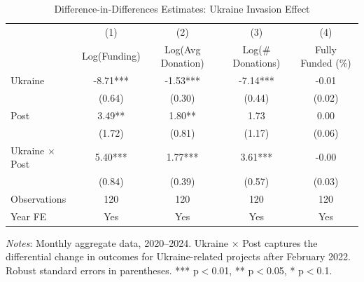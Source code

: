 \begin{table}[htbp]
\centering
\caption{Difference-in-Differences Estimates: Ukraine Invasion Effect}
\label{tab:did}
\begin{threeparttable}
\begin{tabular}{lcccc}
\toprule
& (1) & (2) & (3) & (4) \\
& Log(Funding) & Log(Avg Donation) & Log(\# Donations) & Fully Funded (\%) \\
\midrule
Ukraine & -8.71*** & -1.53*** & -7.14*** & -0.01 \\
& (0.64) & (0.30) & (0.44) & (0.02) \\
Post & 3.49** & 1.80** & 1.73 & 0.00 \\
& (1.72) & (0.81) & (1.17) & (0.06) \\
Ukraine $\times$ Post & 5.40*** & 1.77*** & 3.61*** & -0.00 \\
& (0.84) & (0.39) & (0.57) & (0.03) \\
\addlinespace
Observations & 120 & 120 & 120 & 120 \\
Year FE & Yes & Yes & Yes & Yes \\
\bottomrule
\end{tabular}
\begin{tablenotes}
\small
\item \textit{Notes}: Monthly aggregate data, 2020--2024. Ukraine $\times$ Post captures the differential change in outcomes for Ukraine-related projects after February 2022. Robust standard errors in parentheses. *** p$<$0.01, ** p$<$0.05, * p$<$0.1.
\end{tablenotes}
\end{threeparttable}
\end{table}

